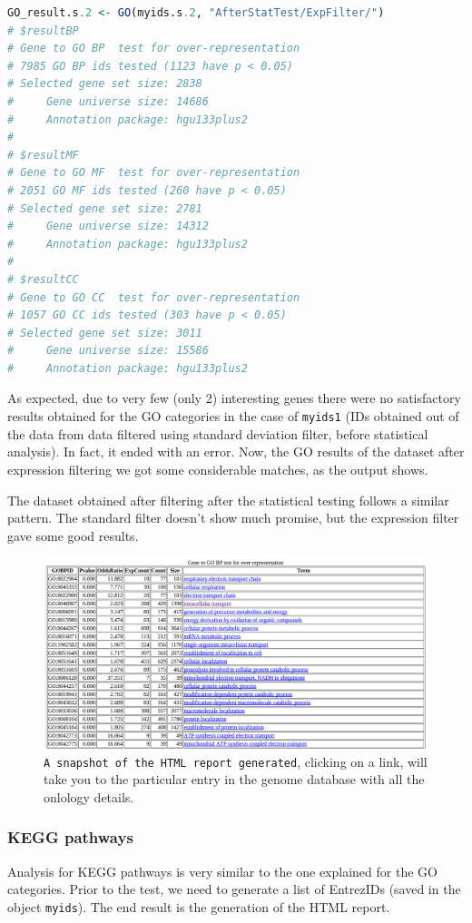 \documentclass[oneside, a4paper, 11pt]{book}
\begin{document}
\begin{lstlisting}[language=R, caption=Gene Set Enrichment Analysis - GO categories]
GO_result.s.2 <- GO(myids.s.2, "AfterStatTest/ExpFilter/")
# $resultBP
# Gene to GO BP  test for over-representation 
# 7985 GO BP ids tested (1123 have p < 0.05)
# Selected gene set size: 2838 
#     Gene universe size: 14686 
#     Annotation package: hgu133plus2 
# 
# $resultMF
# Gene to GO MF  test for over-representation 
# 2051 GO MF ids tested (260 have p < 0.05)
# Selected gene set size: 2781 
#     Gene universe size: 14312 
#     Annotation package: hgu133plus2 
# 
# $resultCC
# Gene to GO CC  test for over-representation 
# 1057 GO CC ids tested (303 have p < 0.05)
# Selected gene set size: 3011 
#     Gene universe size: 15586 
#     Annotation package: hgu133plus2
\end{lstlisting}

As expected, due to very few (only 2) interesting genes there were no satisfactory results obtained for the GO categories in the case of \texttt{myids1} (IDs obtained out of the data from data filtered using standard deviation filter, before statistical analysis). In fact, it ended with an error. Now, the GO results of the dataset after expression filtering we got some considerable matches, as the output shows.

The dataset obtained after filtering after the statistical testing follows a similar pattern. The standard filter doesn't show much promise, but the expression filter gave some good results.

\begin{figure}[h]
    \centering
    \includegraphics[width=\textwidth]{GOreport.png}
    \caption {\texttt{A snapshot of the HTML report generated}, clicking on a link, will take you to the particular entry in the genome database with all the onlology details.}
\end{figure}

\subsubsection{KEGG pathways}
Analysis for KEGG pathways is very similar to the one explained for the GO categories. Prior to the test, we need to generate a list of EntrezIDs (saved in the object \texttt{myids}). The end result is the generation of the HTML report.
\end{document}
